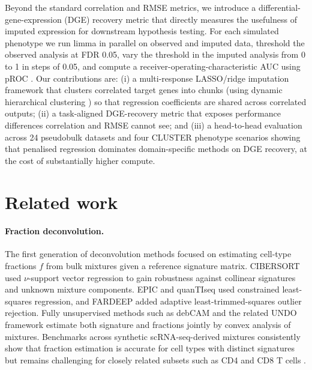 Beyond the standard correlation and RMSE metrics, we introduce a differential-gene-expression (DGE) recovery metric that directly measures the usefulness of imputed expression for downstream hypothesis testing. For each simulated phenotype we run limma \cite{ritchie2015limma} in parallel on observed and imputed data, threshold the observed analysis at FDR 0.05, vary the threshold in the imputed analysis from 0 to 1 in steps of 0.05, and compute a receiver-operating-characteristic AUC using pROC \cite{robin2011proc}. Our contributions are: (i) a multi-response LASSO/ridge imputation framework that clusters correlated target genes into chunks (using dynamic hierarchical clustering \cite{langfelder2008dynamictreecut}) so that regression coefficients are shared across correlated outputs; (ii) a task-aligned DGE-recovery metric that exposes performance differences correlation and RMSE cannot see; and (iii) a head-to-head evaluation across 24 pseudobulk datasets and four CLUSTER phenotype scenarios showing that penalised regression dominates domain-specific methods on DGE recovery, at the cost of substantially higher compute.

\section{Related work}

\paragraph{Fraction deconvolution.} The first generation of deconvolution methods focused on estimating cell-type fractions $f$ from bulk mixtures given a reference signature matrix. CIBERSORT \cite{newman2015robust} used $\nu$-support vector regression to gain robustness against collinear signatures and unknown mixture components. EPIC \cite{racle2017epic} and quanTIseq \cite{finotello2019quantiseq} used constrained least-squares regression, and FARDEEP \cite{hao2019fardeep} added adaptive least-trimmed-squares outlier rejection. Fully unsupervised methods such as debCAM \cite{chen2020debcam} and the related UNDO framework \cite{wang2016undo} estimate both signature and fractions jointly by convex analysis of mixtures. Benchmarks across synthetic scRNA-seq-derived mixtures consistently show that fraction estimation is accurate for cell types with distinct signatures but remains challenging for closely related subsets such as CD4 and CD8 T cells \cite{avilacobos2020benchmarking}.

